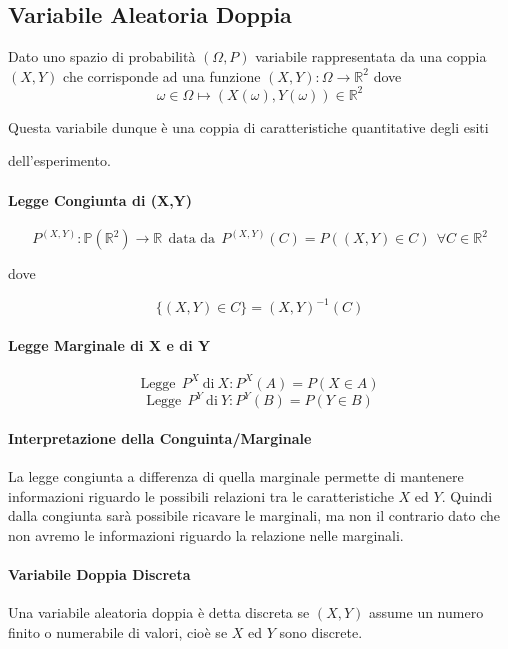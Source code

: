 \documentclass{article}
\begin{document}
\subsection{Variabile Aleatoria Doppia} Dato uno spazio di probabilità $(\Omega, P)$ variabile rappresentata da una coppia $(X,Y)$ che corrisponde ad una funzione $(X,Y): \Omega \rightarrow \mathbb{R}^{2}$
dove \[ \omega \in \Omega \mapsto (X(\omega), Y(\omega)) \in \mathbb{R}^{2} \]

Questa variabile dunque è una coppia di caratteristiche quantitative degli esiti 

dell'esperimento.

\paragraph{Legge Congiunta di (X,Y)} 

\[ P^{(X,Y)}: \mathbb{P}(\mathbb{R}^{2}) \rightarrow \mathbb{R} \:\: \text{data da} \:\: P^{(X,Y)}(C) = P((X,Y) \in C) \:\: \forall C \in \mathbb{R}^{2} \]
\begin{center}
    dove
\end{center}
\[ \{ (X,Y) \in C \} = (X,Y)^{-1} (C) \]

\paragraph{Legge Marginale di X e di Y}

\[ \text{Legge} \: \: P^{X} \: \text{di} \: X: P^{X}(A) = P(X \in A)  \]
\[ \text{Legge} \: \: P^{Y} \: \text{di} \: Y: P^{Y}(B) = P(Y \in B)  \]

\paragraph{Interpretazione della Conguinta/Marginale} La legge congiunta a differenza di quella marginale permette di mantenere informazioni riguardo le possibili
relazioni tra le caratteristiche $X$ ed $Y$. Quindi dalla congiunta sarà possibile ricavare le marginali, ma non il contrario dato che non avremo le informazioni riguardo la relazione nelle marginali.

\newpage

\paragraph{Variabile Doppia Discreta} Una variabile aleatoria doppia è detta discreta se $(X,Y)$ assume un numero finito o numerabile di valori, cioè se $X$ ed $Y$ sono discrete.
\end{document}
